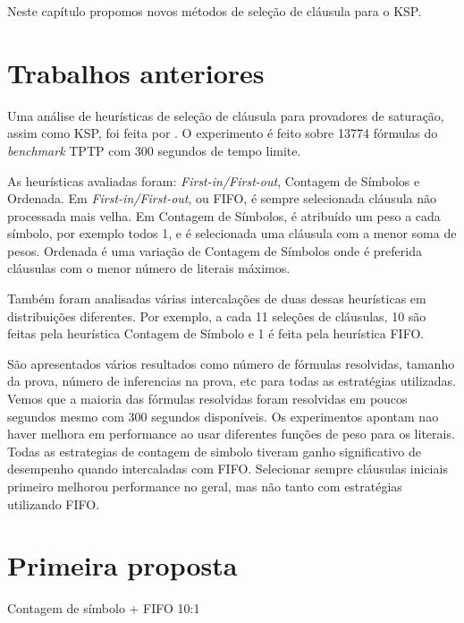 Neste capítulo propomos novos métodos de seleção de cláusula para o KSP.

\section{Trabalhos anteriores}
Uma análise de heurísticas de seleção de cláusula para provadores de saturação, assim como KSP, foi feita por \cite{stephan}. O experimento é feito sobre 13774 fórmulas do \textit{benchmark} TPTP \cite{TPTP} com 300 segundos de tempo limite.

As heurísticas avaliadas foram: \textit{First-in/First-out}, Contagem de Símbolos e Ordenada. Em \textit{First-in/First-out}, ou FIFO, é sempre selecionada cláusula não processada mais velha. Em Contagem de Símbolos, é atribuído um peso a cada símbolo, por exemplo todos 1, e é selecionada uma cláusula com a menor soma de pesos. Ordenada é uma variação de Contagem de Símbolos onde é preferida cláusulas com o menor número de literais máximos.

Também foram analisadas várias intercalações de duas dessas heurísticas em distribuições diferentes. Por exemplo, a cada 11 seleções de cláusulas, 10 são feitas pela heurística Contagem de Símbolo e 1 é feita pela heurística FIFO.

São apresentados vários resultados como número de fórmulas resolvidas, tamanho da prova, número de inferencias na prova, etc para todas as estratégias utilizadas. Vemos que a maioria das fórmulas resolvidas foram resolvidas em poucos segundos mesmo com 300 segundos disponíveis. Os experimentos apontam nao haver melhora em performance ao usar diferentes funções de peso para os literais. Todas as estrategias de contagem de simbolo tiveram ganho significativo de desempenho quando intercaladas com FIFO. Selecionar sempre cláusulas iniciais primeiro melhorou performance no geral, mas não tanto com estratégias utilizando FIFO.

\section{Primeira proposta}
Contagem de símbolo + FIFO 10:1

